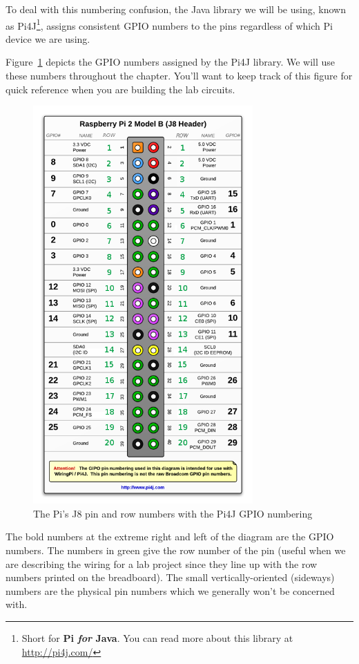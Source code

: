 To
deal with this numbering confusion, the Java library we will be using, known as Pi4J\footnote{Short for \textbf{Pi \textit{for} Java}. You can read more about this library at \url{http://pi4j.com/}}, assigns consistent GPIO numbers to the
pins regardless of which Pi device we are using. 

\pagebreak

Figure~\ref{fig:pi4jgpio} depicts the GPIO numbers assigned by the Pi4J library. We will use these numbers throughout the chapter. You'll want to keep 
track of this figure for quick reference when you are building the lab circuits.

\begin{figure}[H]
	\centering
	\includegraphics[height=6.0in]{pi_images/j8header-2b-dsr-flat.png}
	\caption{The Pi's J8 pin and row numbers with the Pi4J GPIO numbering}
	\label{fig:pi4jgpio}
\end{figure}

The bold numbers at the extreme right and left of the diagram are the GPIO numbers. The numbers in green give the row number of the pin (useful when we are describing the wiring for a lab project since they line up with the row numbers printed on the breadboard). The small vertically-oriented (sideways) numbers are the physical pin numbers which we generally won't be concerned with.

